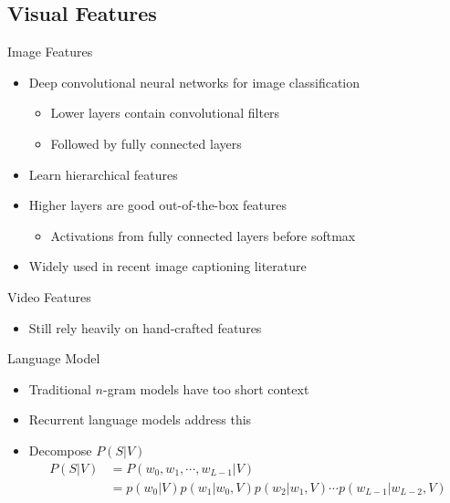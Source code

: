 \documentclass{beamer}
\begin{document}
\subsection{Visual Features}
\begin{frame}{Image Features}
\begin{itemize}
\item Deep convolutional neural networks for image classification 
    \begin{itemize}
        \item Lower layers contain convolutional filters 
        \item Followed by fully connected layers
    \end{itemize}
\item Learn hierarchical features
\item Higher layers are good out-of-the-box features  
    \begin{itemize}    
        \item Activations from fully connected layers before softmax 
    \end{itemize}
\item Widely used in recent image captioning literature~\cite{Vinyals_2015_CVPR,Fang2015} 
\end{itemize} 
\end{frame}
\begin{frame}{Video Features}
\begin{itemize}
\item Still rely heavily on hand-crafted features
\end{itemize} 
\end{frame}
\begin{frame}{Language Model}
\begin{itemize}
\item Traditional $n$-gram models have too short context
\item Recurrent language models address this
\item Decompose $P(S|V)$
    \begin{align*}
        \label{eq:langB2} 
        P(S|V) &= P(w_0, w_1, \cdots, w_{L-1}|V) \\
               &= p(w_0|V)p(w_1|w_0,V)p(w_2|w_1,V)\cdots p(w_{L-1}|w_{L-2},V)
    \end{align*}
\end{itemize} 
\end{frame}
\end{document}
